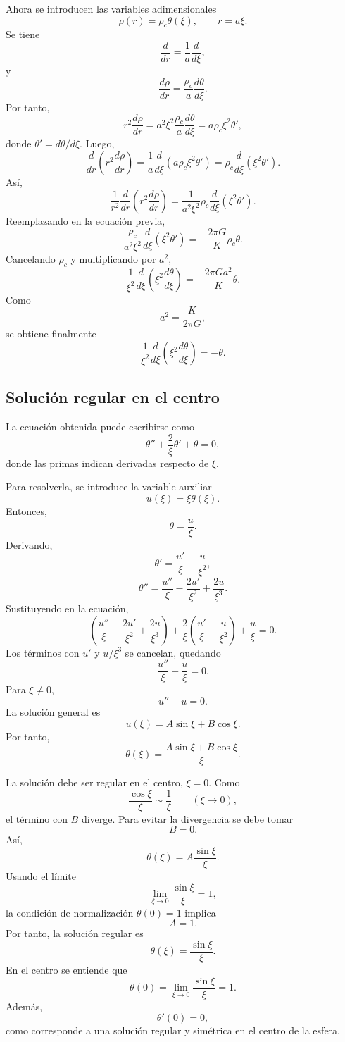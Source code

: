\documentclass[11pt,a4paper]{article}
\begin{document}
Ahora se introducen las variables adimensionales
\[
\rho(r)=\rho_c\theta(\xi), \qquad r=a\xi .
\]
Se tiene
\[
\frac{d}{dr}=\frac{1}{a}\frac{d}{d\xi},
\]
y
\[
\frac{d\rho}{dr}=\frac{\rho_c}{a}\frac{d\theta}{d\xi}.
\]
Por tanto,
\[
r^{2}\frac{d\rho}{dr}
=a^{2}\xi^{2}\frac{\rho_c}{a}\frac{d\theta}{d\xi}
=a\rho_c\xi^{2}\theta',
\]
donde $\theta'=d\theta/d\xi$. Luego,
\[
\frac{d}{dr}\left(r^{2}\frac{d\rho}{dr}\right)
=\frac{1}{a}\frac{d}{d\xi}
\left(a\rho_c\xi^{2}\theta'\right)
=\rho_c\frac{d}{d\xi}\left(\xi^{2}\theta'\right).
\]
Así,
\[
\frac{1}{r^{2}}\frac{d}{dr}\left(r^{2}\frac{d\rho}{dr}\right)
=\frac{1}{a^{2}\xi^{2}}\rho_c
\frac{d}{d\xi}\left(\xi^{2}\theta'\right).
\]
Reemplazando en la ecuación previa,
\[
\frac{\rho_c}{a^{2}\xi^{2}}
\frac{d}{d\xi}\left(\xi^{2}\theta'\right)
=-\frac{2\pi G}{K}\rho_c\theta .
\]
Cancelando $\rho_c$ y multiplicando por $a^{2}$,
\[
\frac{1}{\xi^{2}}
\frac{d}{d\xi}\left(\xi^{2}\frac{d\theta}{d\xi}\right)
=-\frac{2\pi G a^{2}}{K}\theta .
\]
Como
\[
a^{2}=\frac{K}{2\pi G},
\]
se obtiene finalmente
\[
\boxed{
\frac{1}{\xi^{2}}
\frac{d}{d\xi}\left(\xi^{2}\frac{d\theta}{d\xi}\right)
=-\theta
}.
\]

\subsection{Solución regular en el centro}

La ecuación obtenida puede escribirse como
\[
\theta''+\frac{2}{\xi}\theta'+\theta=0,
\]
donde las primas indican derivadas respecto de $\xi$.

Para resolverla, se introduce la variable auxiliar
\[
u(\xi)=\xi\theta(\xi).
\]
Entonces,
\[
\theta=\frac{u}{\xi}.
\]
Derivando,
\[
\theta'=\frac{u'}{\xi}-\frac{u}{\xi^{2}},
\]
\[
\theta''=\frac{u''}{\xi}-\frac{2u'}{\xi^{2}}+\frac{2u}{\xi^{3}}.
\]
Sustituyendo en la ecuación,
\[
\left(\frac{u''}{\xi}-\frac{2u'}{\xi^{2}}+\frac{2u}{\xi^{3}}\right)
+\frac{2}{\xi}
\left(\frac{u'}{\xi}-\frac{u}{\xi^{2}}\right)
+\frac{u}{\xi}=0.
\]
Los términos con $u'$ y $u/\xi^{3}$ se cancelan, quedando
\[
\frac{u''}{\xi}+\frac{u}{\xi}=0.
\]
Para $\xi\neq 0$,
\[
u''+u=0.
\]
La solución general es
\[
u(\xi)=A\sin\xi+B\cos\xi.
\]
Por tanto,
\[
\theta(\xi)=\frac{A\sin\xi+B\cos\xi}{\xi}.
\]

La solución debe ser regular en el centro, $\xi=0$. Como
\[
\frac{\cos\xi}{\xi}\sim \frac{1}{\xi}
\qquad (\xi\to 0),
\]
el término con $B$ diverge. Para evitar la divergencia se debe tomar
\[
B=0.
\]
Así,
\[
\theta(\xi)=A\frac{\sin\xi}{\xi}.
\]
Usando el límite
\[
\lim_{\xi\to 0}\frac{\sin\xi}{\xi}=1,
\]
la condición de normalización $\theta(0)=1$ implica
\[
A=1.
\]
Por tanto, la solución regular es
\[
\boxed{
\theta(\xi)=\frac{\sin\xi}{\xi}
}.
\]
En el centro se entiende que
\[
\theta(0)=\lim_{\xi\to 0}\frac{\sin\xi}{\xi}=1.
\]
Además,
\[
\theta'(0)=0,
\]
como corresponde a una solución regular y simétrica en el centro de la esfera.
\end{document}
